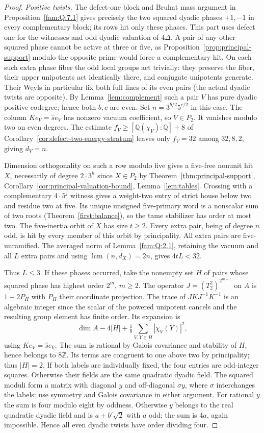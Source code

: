 \documentclass[11pt,a4paper]{article}
\numberwithin{equation}{section}
\theoremstyle{remark}
\newcommand{\ZZ}{\mathbb Z}
\newcommand{\QQ}{\mathbb Q}
\newcommand{\lcm}{\operatorname{lcm}}
\begin{document}
\begin{proof}
\smallskip\noindent\emph{Positive twists.}
The defect-one block and Bruhat mass argument in Proposition~\ref{fam:Q:7.1} gives precisely the two squared dyadic phases
$+1,-1$ in every complementary block; its rows hit only these phases.
This part uses defect one for the witnesses and odd dyadic valuation
of $4\Delta$. A pair of any other squared phase cannot be active at
three or five, as Proposition~\ref{prop:principal-support} modulo the opposite prime
would force a complementary hit. On each such extra phase fiber the
odd local groups act trivially: they preserve the fiber, their upper
unipotents act identically there, and conjugate unipotents generate.
Their Weyls in particular fix both full lines of its even pairs
(the actual dyadic twists are opposite). By Lemma~\ref{lem:complement} such a
pair $V$ has pure dyadic positive codegree; hence both $b,c$ are even.
Set $n=3^{b/2}5^{c/2}$ in this case. The column
$K e_V=\widehat s e_V$ has nonzero vacuum coefficient, so $V\in P_2$.
It vanishes modulo two on even degrees. The estimate
$f_V\ge[\QQ(\chi_V):\QQ]+8$ of Corollary~\ref{cor:defect-two-energy-stratum} leaves only
$f_V=32$ among $32,8,2$, giving $d_V=n$.

Dimension orthogonality on such a row modulo five gives a five-free
nonunit hit $X$, necessarily of degree $2\cdot3^h$ since $X\in P_2$
by Theorem~\ref{thm:principal-support}, Corollary~\ref{cor:principal-valuation-bound}, Lemma~\ref{lem:tables}. Crossing with a
complementary $4\cdot5^j$ witness gives a weight-two entry of strict
house below two and residue two at five. Its unique unsigned
five-primary word is a nonscalar sum of two roots (Theorem~\ref{first:balance}),
so the tame stabilizer has order at most two. The five-inertia orbit
of $X$ has size $t\ge2$. Every extra pair, being of degree $n$ odd,
is hit by every member of this orbit by principality. All extra pairs
are five-unramified. The averaged norm of Lemma~\ref{fam:Q:2.1}, retaining
the vacuum and all $L$ extra pairs and using $\lcm(n,d_X)=2n$, gives
$4tL<32$.

Thus $L\le3$. If these phases occurred, take the nonempty set $H$ of
pairs whose squared phase has highest order $2^m$, $m\ge2$. The
operator $J=(T_2^2)^{2^{m-1}}$ on $A$ is $1-2P_H$ with $P_H$ their
coordinate projection. The trace of $JKJ^{-1}K^{-1}$ is an algebraic
integer since the scalar of the powered unipotent cancels and the
resulting group element has finite order. Its expansion is
\[
 \dim A-4|H|+\tfrac18\sum_{V,Y\in H}|\chi_V(Y)|^2 ,
\]
using $K e_V=\widehat s e_V$. The sum is rational by Galois
covariance and stability of $H$, hence belongs to $8\ZZ$. Its terms
are congruent to one above two by principality; thus $|H|=2$. If both labels
are individually fixed, the four entries are odd-integer squares.
Otherwise their fields are the same quadratic dyadic field. The
squared moduli form a matrix with diagonal $y$ and off-diagonal
$\sigma y$, where $\sigma$ interchanges the labels: use symmetry
and Galois covariance in either argument. For rational $y$ the sum
is four modulo eight by oddness. Otherwise $y$ belongs to the real
quadratic dyadic field and is $a+b'\sqrt2$ with $a$ odd; the sum
is $4a$, again impossible. Hence all even dyadic twists have order
dividing four.


\end{proof}
\end{document}
